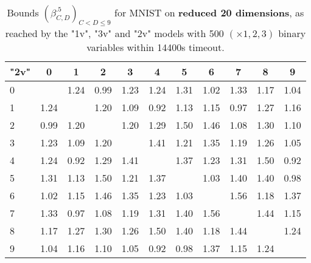 \begin{table*}
\vspace{0.3cm}

	\begin{tabular}{|l||c|c|c|c|c|c|c|c|c|c|}\hline
		{\bf "2v"} & 0 & 1 & 2 & 3 & 4 & 5 & 6 & 7 & 8 & 9 \\\hline\hline
	0 & &1.24 &0.99 &1.23 &1.24 &1.31 &1.02 &1.33 &1.17 &1.04  \\\hline
	1 &1.24 & &1.20 &1.09 &0.92 &1.13 &1.15 &0.97 &1.27 &1.16  \\\hline
	2 &0.99 &1.20 & &1.20 &1.29 &1.50 &1.46 &1.08 &1.30 &1.10  \\\hline
	3 &1.23 &1.09 &1.20 & &1.41 &1.21 &1.35 &1.19 &1.26 &1.05  \\\hline
	4 &1.24 &0.92 &1.29 &1.41 & &1.37 &1.23 &1.31 &1.50 &0.92  \\\hline
	5 &1.31 &1.13 &1.50 &1.21 &1.37 & &1.03 &1.40 &1.40 &0.98  \\\hline
	6 &1.02 &1.15 &1.46 &1.35 &1.23 &1.03 & &1.56 &1.18 &1.37  \\\hline
	7 &1.33 &0.97 &1.08 &1.19 &1.31 &1.40 &1.56 & &1.44 &1.15  \\\hline
	8 &1.17 &1.27 &1.30 &1.26 &1.50 &1.40 &1.18 &1.44 & &1.24  \\\hline
	9 &1.04 &1.16 &1.10 &1.05 &0.92 &0.98 &1.37 &1.15 &1.24 &  \\\hline
	\end{tabular}
	
	\caption{Bounds $(\beta^{.5}_{C,D})_{C < D \leq 9}$ 
	for MNIST on {\bf reduced 20 dimensions}, as reached by the "1v", "3v" and "2v" models
	with 500 $(\times 1,2,3)$ binary variables within 14400s timeout.}
    \label{table.pair}
\end{table*}
